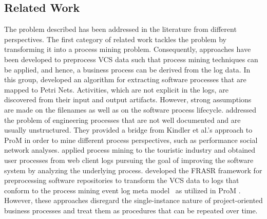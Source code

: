 

\subsection{Related Work}\label{sec:bpm2015:related}

The problem described has been addressed in the literature from different perspectives. The first category of related work tackles the problem by transforming it into a process mining problem. Consequently, approaches have been developed to preprocess VCS data such that process mining techniques can be applied, and hence, a business process can be derived from the log data.
In this group, \cite{DBLP:conf/se/KindlerRS06,kindler2006incremental} developed an algorithm for extracting software processes that are mapped to Petri Nets. Activities, which are not explicit in the logs, are discovered from their input and output artifacts. However, strong assumptions are made on the filenames as well as on the software process lifecycle. %
\cite{rubin2007process} addressed the problem of engineering processes that are not well documented and are usually unstructured. They provided a bridge from Kindler et al.'s approach to ProM \cite{van2005prom} in order to mine different process perspectives, such as performance social network analyses. %
\cite{rubin2014agile} applied process mining to the touristic industry and obtained user processes from web client logs pursuing the goal of improving the software system by analyzing the underlying process.
\cite{Poncin2011a} developed the FRASR framework for preprocessing software repositories to transform the VCS data to logs that conform to the process mining event log meta model~\cite{van2005meta} as utilized in ProM \cite{van2005prom}.
However, these approaches disregard the single-instance nature of project-oriented business processes and treat them as procedures that can be repeated over time.

